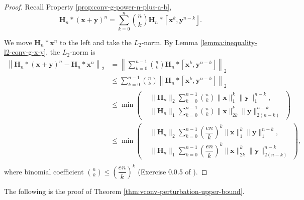 \documentclass[twoside,11pt]{article}
\def\tvar#1{\mathbf{#1}} %
\def\lcerfl#1{\left\lceil{#1}\right\rfloor}
\begin{document}
\begin{proof}
  Recall Property \ref{prop:conv-g-power-n-plus-a-b},
  \begin{equation}
    \tvar{H}_n * (\tvar{x} + \tvar{y})^n
    = \sum_{k=0}^{n} \binom{n}{k} \tvar{H}_n * \lcerfl{\tvar{x}^k, \tvar{y}^{n-k}}.
  \end{equation}

  We move \(\tvar{H}_n * \tvar{x}^n\) to the left and take the \(L_2\)-norm.
    By Lemma \ref{lemma:inequality-l2-conv-g-x-y}, the \(L_2\)-norm is
  \begin{equation*}
    \begin{aligned}
      \left\| \tvar{H}_n * (\tvar{x} + \tvar{y})^n - \tvar{H}_n  * \tvar{x}^n \right\|_2
       & = \left\|
      \sum_{k=0}^{n-1} \binom{n}{k} \tvar{H}_n * \lcerfl{\tvar{x}^k, \tvar{y}^{n-k}}
      \right\|_2                                          \\
       & \le \sum_{k=0}^{n-1} \binom{n}{k} \left\|
      \tvar{H}_n * \lcerfl{\tvar{x}^k, \tvar{y}^{n-k}}
      \right\|_2                                          \\
       & \le \min\left(\begin{aligned}
           & \| \tvar{H}_n \|_2 \sum_{k=0}^{n-1} \binom{n}{k} \|\tvar{x}\|_1^k \| \tvar{y} \|_1^{n-k},          \\
           & \| \tvar{H}_n \|_1 \sum_{k=0}^{n-1} \binom{n}{k} \|\tvar{x}\|_{2k}^k \| \tvar{y} \|_{2(n-k)}^{n-k}
        \end{aligned}\right)  \\
       & \le \min\left(\begin{aligned}
           & \| \tvar{H}_n \|_2 \sum_{k=0}^{n-1} \left(\dfrac{e n}{k}\right)^k \|\tvar{x}\|_1^k \| \tvar{y} \|_1^{n-k},          \\
           & \| \tvar{H}_n \|_1 \sum_{k=0}^{n-1} \left(\dfrac{e n}{k}\right)^k \|\tvar{x}\|_{2k}^k \| \tvar{y} \|_{2(n-k)}^{n-k}
        \end{aligned}\right), \\
    \end{aligned}
  \end{equation*}
  where binomial coefficient \(\binom{n}{k} \le \left(\dfrac{e n}{k}\right)^k\) (Exercise 0.0.5 of \citep{vershynin_2018}).
\end{proof}

The following is the proof of Theorem \ref{thm:vconv-perturbation-upper-bound}.
\end{document}
